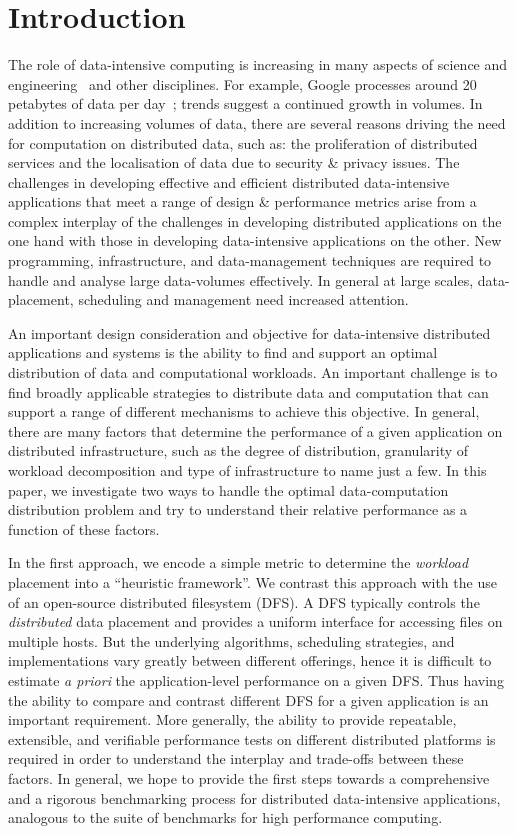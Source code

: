 \documentclass{rspublic}
\begin{document}
\vspace{-0.5cm}

\section{Introduction} 
The role of data-intensive computing is increasing in many aspects of
science and engineering~\citep{fourthparadigm} and other
disciplines. For example, Google processes around 20 petabytes of data
per day~\citep{google}; trends suggest a continued growth in
volumes. In addition to increasing volumes of data, there are several
reasons driving the need for computation on distributed data, such as:
the proliferation of distributed services and the localisation of data
due to security \& privacy issues. The challenges in developing
effective and efficient distributed data-intensive applications that
meet a range of design \& performance metrics arise from a complex
interplay of the challenges in developing distributed applications on
the one hand with those in developing data-intensive applications on
the other. New programming, infrastructure, and data-management
techniques are required to handle and analyse large data-volumes
effectively. In general at large scales, data-placement, scheduling
and management need increased attention.

An important design consideration and objective for data-intensive
distributed applications and systems is the ability to find and
support an optimal distribution of data and computational
workloads. An important challenge is to find broadly applicable
strategies to distribute data and computation that can support a range
of different mechanisms to achieve this objective. In general, there
are many factors that determine the performance of a given
application on distributed infrastructure, such as the degree of
distribution, granularity of workload decomposition and type of
infrastructure to name just a few.  In this paper, we investigate two
ways to handle the optimal data-computation distribution problem and
try to understand their relative performance as a function of these factors.

In the first approach, we encode a simple metric to determine the {\it
  workload} placement into a ``heuristic framework''. We contrast this
approach with the use of an open-source distributed filesystem (DFS).
A DFS typically controls the {\it distributed} data placement and
provides a uniform interface for accessing files on multiple hosts.
But the underlying algorithms, scheduling strategies, and
implementations vary greatly between different offerings, hence it is
difficult to estimate {\it a priori} the application-level performance
on a given DFS.  Thus having the ability to compare and contrast
different DFS for a given application is an important requirement.
More generally, the ability to provide repeatable, extensible, and
verifiable performance tests on different distributed platforms is
required in order to understand the interplay and trade-offs between
these factors.  In general, we hope to provide the first steps towards
a comprehensive and a rigorous benchmarking process for distributed
data-intensive applications, analogous to the suite of benchmarks for
high performance computing.
\end{document}
